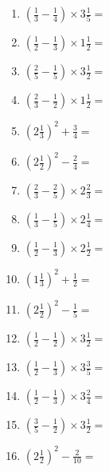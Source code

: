 \documentclass[12pt]{article}
\begin{document}
\begin{enumerate}
\newpage
\item \large $ \left( \frac{1}{3} - \frac{1}{4} \right) \times 3 \frac{1}{5} = $ \vspace{1.6cm}
\item \large $ \left( \frac{1}{2} - \frac{1}{3} \right) \times 1 \frac{1}{2} = $ \vspace{1.6cm}
\item \large $ \left( \frac{2}{5} - \frac{1}{5} \right) \times 3 \frac{1}{2} = $ \vspace{1.6cm}
\item \large $ \left( \frac{2}{3} - \frac{1}{2} \right) \times 1 \frac{1}{2} = $ \vspace{1.6cm}
\item \large $ \left( 2 \frac{1}{3} \right)^2 + \frac{3}{4} = $ \vspace{1.6cm}
\item \large $ \left( 2 \frac{1}{2} \right)^2 - \frac{2}{4} = $ \vspace{1.6cm}
\item \large $ \left( \frac{2}{3} - \frac{2}{5} \right) \times 2 \frac{2}{3} = $ \vspace{1.6cm}
\item \large $ \left( \frac{1}{3} - \frac{1}{5} \right) \times 2 \frac{1}{4} = $ \vspace{1.6cm}
\item \large $ \left( \frac{1}{2} - \frac{1}{3} \right) \times 2 \frac{1}{2} = $ \vspace{1.6cm}
\item \large $ \left( 1 \frac{1}{3} \right)^2 + \frac{1}{2} = $ \vspace{1.6cm}
\newpage
\item \large $ \left( 2 \frac{1}{2} \right)^2 - \frac{1}{5} = $ \vspace{1.6cm}
\item \large $ \left( \frac{1}{2} - \frac{1}{2} \right) \times 3 \frac{1}{2} = $ \vspace{1.6cm}
\item \large $ \left( \frac{1}{2} - \frac{1}{3} \right) \times 3 \frac{3}{5} = $ \vspace{1.6cm}
\item \large $ \left( \frac{1}{2} - \frac{1}{3} \right) \times 3 \frac{2}{4} = $ \vspace{1.6cm}
\item \large $ \left( \frac{3}{5} - \frac{1}{2} \right) \times 3 \frac{1}{2} = $ \vspace{1.6cm}
\item \large $ \left( 2 \frac{1}{2} \right)^2 - \frac{2}{10} = $ \vspace{1.6cm}

\end{enumerate}
\end{document}

